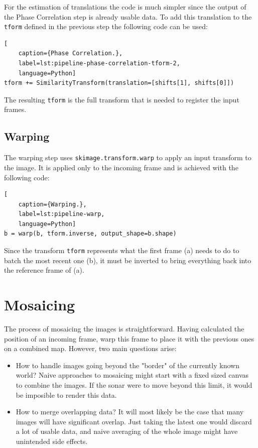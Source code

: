 For the estimation of translations the code is much simpler since the output of the Phase Correlation step is already usable data. To add this translation to the \lstinline{tform} defined in the previous step the following code can be used:
\begin{lstlisting}[
    caption={Phase Correlation.},
    label=lst:pipeline-phase-correlation-tform-2,
    language=Python]
tform += SimilarityTransform(translation=[shifts[1], shifts[0]])
\end{lstlisting}

The resulting \lstinline{tform} is the full transform that is needed to register the input frames. 

\subsection{Warping}
\label{sec:warping}

The warping step uses \texttt{skimage.transform.warp} to apply an input transform to the image. It is applied only to the incoming frame and is achieved with the following code:

\begin{lstlisting}[
    caption={Warping.},
    label=lst:pipeline-warp,
    language=Python]
b = warp(b, tform.inverse, output_shape=b.shape)
\end{lstlisting}

Since the transform \lstinline{tform} represents what the first frame (a) needs to do to batch the most recent one (b), it must be inverted to bring everything back into the reference frame of (a).


\section{Mosaicing}

The process of mosaicing the images is straightforward. Having calculated the position of an incoming frame, warp this frame to place it with the previous ones on a combined map. However, two main questions arise:

\begin{itemize}
    \item How to handle images going beyond the "border" of the currently known world? Naive approaches to mosaicing might start with a fixed sized canvas to combine the images. If the sonar were to move beyond this limit, it would be imposible to render this data.
    \item How to merge overlapping data? It will most likely be the case that many images will have significant overlap. Just taking the latest one would discard a lot of usable data, and naive averaging of the whole image might have unintended side effects.
\end{itemize}


